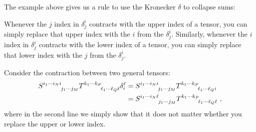 \begin{subappendices}
The example above gives us a rule to use the Kronecker $\delta$ to collapse sums:
\begin{newrule}
Whenever the $j$ index in $\delta^i_j$ contracts with the upper index of a tensor, you can simply replace that upper index with the $i$ from the $\delta^i_j$. Similarly, whenever the $i$ index in $\delta^i_j$ contracts with the lower index of a tensor, you can simply replace that lower index with the $j$ from the $\delta^i_j$.
\end{newrule}

\begin{example}
Consider the contraction between two general tensors:
\begin{align}
    S\aij{i_1\cdots i_N i}{j_1\cdots j_M} T\aij{k_1\cdots k_P}{\ell_1\cdots \ell_Q \ell}
    \delta^\ell_i &= 
    S\aij{i_1\cdots i_N i}{j_1\cdots j_M} T\aij{k_1\cdots k_P}{\ell_1\cdots \ell_Q i}
    \\
    &=
    S\aij{i_1\cdots i_N \ell}{j_1\cdots j_M} T\aij{k_1\cdots k_P}{\ell_1\cdots \ell_Q \ell}\ ,
\end{align}
where in the second line we simply show that it does not matter whether you replace the upper or lower index.
\end{example}



\end{subappendices}
